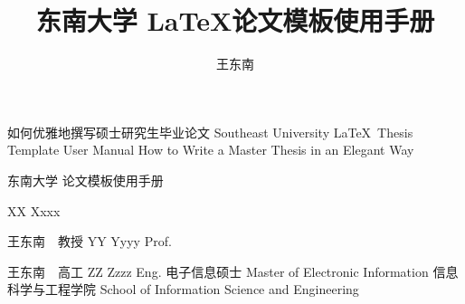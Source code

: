 \documentclass[algorithmlist,figurelist,tablelist,nomlist,engineer]{template/seumasterthesis}
\begin{document}

\title
    {东南大学 \LaTeX 论文模板使用手册}        %
    {如何优雅地撰写硕士研究生毕业论文}         %
    {Southeast University \LaTeX ~Thesis Template User Manual}  %
    {How to Write a Master Thesis in an Elegant Way}            %

\spine
    {东南大学  论文模板使用手册} 
    {}                                                               

\author
    {王东南}                        %
    {XX Xxxx}                  %

\advisor
    {王东南　教授}                %
    {YY Yyyy}        %
    {Prof.}                     %
    
\coadvisor                 %
    {王东南　高工}                  %
    {ZZ Zzzz}             %
    {Eng.}                 %
\degreetype                        %
    {电子信息硕士}
    {Master of Electronic Information}
\authorizedate{}                  %
\committeechair{}               %
\reviewer{}{}                %
\department                        %
    {信息科学与工程学院}
    {School of Information Science and Engineering}
\end{document}
